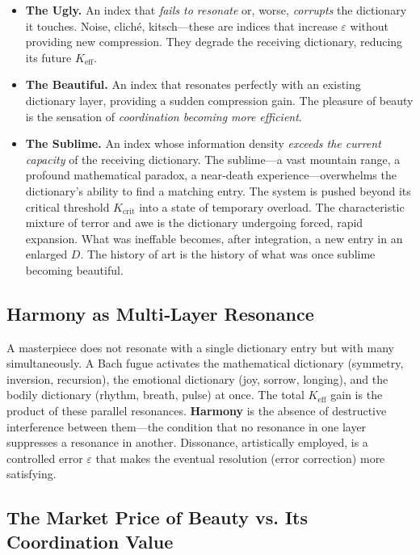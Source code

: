 \documentclass[12pt,a4paper]{article}
\begin{document}
	\begin{itemize}[leftmargin=*]
		\item \textbf{The Ugly.} An index that \emph{fails to resonate} or, worse, \emph{corrupts} the dictionary it touches. Noise, cliché, kitsch---these are indices that increase $\varepsilon$ without providing new compression. They degrade the receiving dictionary, reducing its future $K_{\mathrm{eff}}$.
		\item \textbf{The Beautiful.} An index that resonates perfectly with an existing dictionary layer, providing a sudden compression gain. The pleasure of beauty is the sensation of \emph{coordination becoming more efficient}.
		\item \textbf{The Sublime.} An index whose information density \emph{exceeds the current capacity} of the receiving dictionary. The sublime---a vast mountain range, a profound mathematical paradox, a near‑death experience---overwhelms the dictionary’s ability to find a matching entry. The system is pushed beyond its critical threshold $K_{\mathrm{crit}}$ into a state of temporary overload. The characteristic mixture of terror and awe is the dictionary undergoing forced, rapid expansion. What was ineffable becomes, after integration, a new entry in an enlarged $D$. The history of art is the history of what was once sublime becoming beautiful.
	\end{itemize}
	
	\subsection{Harmony as Multi‑Layer Resonance}
	
	A masterpiece does not resonate with a single dictionary entry but with many simultaneously. A Bach fugue activates the mathematical dictionary (symmetry, inversion, recursion), the emotional dictionary (joy, sorrow, longing), and the bodily dictionary (rhythm, breath, pulse) at once. The total $K_{\mathrm{eff}}$ gain is the product of these parallel resonances. \textbf{Harmony} is the absence of destructive interference between them---the condition that no resonance in one layer suppresses a resonance in another. Dissonance, artistically employed, is a controlled error $\varepsilon$ that makes the eventual resolution (error correction) more satisfying.
	
	\subsection{The Market Price of Beauty vs. Its Coordination Value}
	
\end{document}
